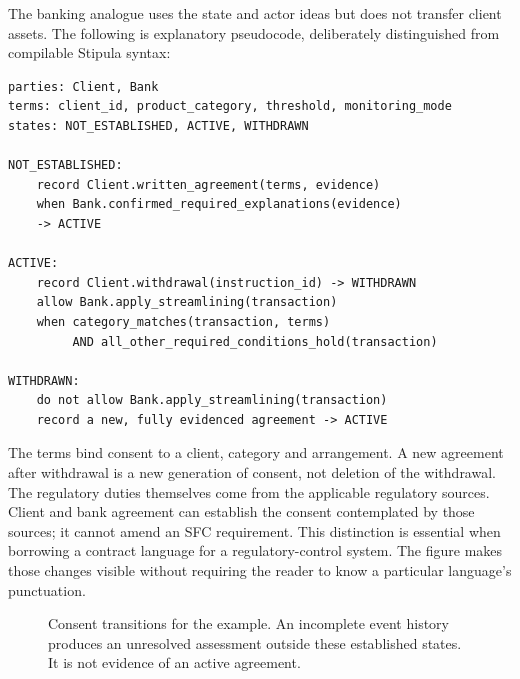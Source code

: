 \documentclass[12pt,a4paper,oneside,openany]{book}
\begin{document}
The banking analogue uses the state and actor ideas but does not transfer client
assets. The following is explanatory pseudocode, deliberately distinguished
from compilable Stipula syntax:
\begin{lstlisting}[caption={A consent model inspired by Stipula. ``Record'' observes an event; ``allow'' describes the control's decision.}]
parties: Client, Bank
terms: client_id, product_category, threshold, monitoring_mode
states: NOT_ESTABLISHED, ACTIVE, WITHDRAWN

NOT_ESTABLISHED:
    record Client.written_agreement(terms, evidence)
    when Bank.confirmed_required_explanations(evidence)
    -> ACTIVE

ACTIVE:
    record Client.withdrawal(instruction_id) -> WITHDRAWN
    allow Bank.apply_streamlining(transaction)
    when category_matches(transaction, terms)
         AND all_other_required_conditions_hold(transaction)

WITHDRAWN:
    do not allow Bank.apply_streamlining(transaction)
    record a new, fully evidenced agreement -> ACTIVE
\end{lstlisting}
The terms bind consent to a client, category and arrangement. A new agreement
after withdrawal is a new generation of consent, not deletion of the withdrawal.
The regulatory duties themselves come from the applicable regulatory sources.
Client and bank agreement can establish the consent contemplated by those
sources; it cannot amend an SFC requirement. This distinction is essential when
borrowing a contract language for a regulatory-control system.
The figure makes those changes visible without requiring the reader to know a
particular language's punctuation.

\begin{figure}[htbp]
\centering
{}
\caption{Consent transitions for the example. An incomplete event history produces
an unresolved assessment outside these established states. It is not evidence
of an active agreement.}
\label{fig:consent-tutorial}
\end{figure}
\end{document}
